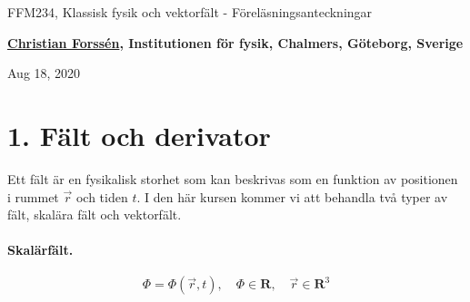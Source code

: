 \documentclass[%
oneside,                 %
final,                   %
10pt]{article}
\begin{document}

\newcommand{\exercisesection}[1]{\subsection*{#1}}







\thispagestyle{empty}

\begin{center}
{\LARGE\bf
\begin{spacing}{1.25}
FFM234, Klassisk fysik och vektorfält - Föreläsningsanteckningar
\end{spacing}
}
\end{center}


\begin{center}
{\bf \href{{http://fy.chalmers.se/subatom/tsp/}}{Christian Forssén}, Institutionen för fysik, Chalmers, Göteborg, Sverige${}^{}$} \\ [0mm]
\end{center}

\begin{center}
\end{center}
    

\begin{center}
Aug 18, 2020
\end{center}

\vspace{1cm}


\section*{1. Fält och derivator}

Ett fält är en fysikalisk storhet som kan beskrivas som en funktion av
positionen i rummet $\vec{r}$ och tiden $t$.  I den här kursen kommer vi
att behandla två typer av fält, skalära fält och vektorfält.

\paragraph{Skalärfält.}
\begin{equation}
\Phi = \Phi(\vec{r},t), \quad \Phi \in \mathbf{R},\quad \vec{r} \in \mathbf{R}^3
\end{equation}
\end{document}
